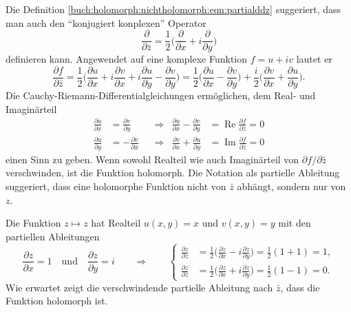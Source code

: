 Die Definition
\eqref{buch:holomorph:nichtholomorph:eqn:partialddz}
suggeriert, dass man auch den ``konjugiert konplexen'' Operator
\begin{equation}
\frac{\partial}{\partial\bar{z}}
=
\frac12\biggl(
\frac{\partial}{\partial x}
+
i
\frac{\partial}{\partial y}
\biggr)
\end{equation}
definieren kann.
Angewendet auf eine komplexe Funktion $f=u+iv$ lautet er
\[
\frac{\partial f}{\partial \bar{z}}
=
\frac12
\biggl(
\frac{\partial u}{\partial x} + i\frac{\partial v}{\partial x}
+
i\frac{\partial u}{\partial y} - \frac{\partial v}{\partial y}
\biggr)
=
\frac12\biggl(
\frac{\partial u}{\partial x}
-
\frac{\partial v}{\partial y}
\biggr)
+
\frac{i}2\biggl(
\frac{\partial v}{\partial x}
+
\frac{\partial u}{\partial y}
\biggr).
\]
Die Cauchy-Riemann-Differentialgleichungen ermöglichen, dem Real-
und Imaginärteil
\begin{align*}
\frac{\partial u}{\partial x}
&=
\frac{\partial v}{\partial y}
&&\Rightarrow&
\frac{\partial u}{\partial x}-\frac{\partial v}{\partial y}
&=
\operatorname{Re}
\frac{\partial f}{\partial\bar{z}}
=
0
\\
\frac{\partial u}{\partial y}
&=
-\frac{\partial v}{\partial x}
&&\Rightarrow&
\frac{\partial v}{\partial x}
+
\frac{\partial u}{\partial y}
&=
\operatorname{Im}\frac{\partial f}{\partial\bar{z}}
=
0
\end{align*}
einen Sinn zu geben.
Wenn sowohl Realteil wie auch Imaginärteil von $\partial f/\partial\bar{z}$
verschwinden, ist die Funktion holomorph.
Die Notation als partielle Ableitung suggeriert, dass eine holomorphe
Funktion nicht von $\bar{z}$ abhängt, sondern nur von $z$.

\begin{beispiel}
Die Funktion $z\mapsto z$ hat Realteil $u(x,y)=x$ und $v(x,y)=y$
mit den partiellen Ableitungen
\[
\frac{\partial z}{\partial x} = 1 
\quad\text{und}\quad
\frac{\partial z}{\partial y} = i
\qquad\Rightarrow\qquad
\left\{
\begin{aligned}
\frac{\partial z}{\partial z}
&=
\frac12
\biggl(
\frac{\partial z}{\partial x}
-i
\frac{\partial z}{\partial y}
\biggr)
=
\frac{1}{2}
(1+1)
=
1,
\\
\frac{\partial z}{\partial\bar{z}}
&=
\frac12
\biggl(
\frac{\partial z}{\partial x}
+i
\frac{\partial z}{\partial y}
\biggr)
=
\frac12(1-1)
=
0.
\end{aligned}
\right.
\]
Wie erwartet zeigt die verschwindende partielle Ableitung nach $\bar{z}$,
dass die Funktion holomorph ist.
\end{beispiel}

